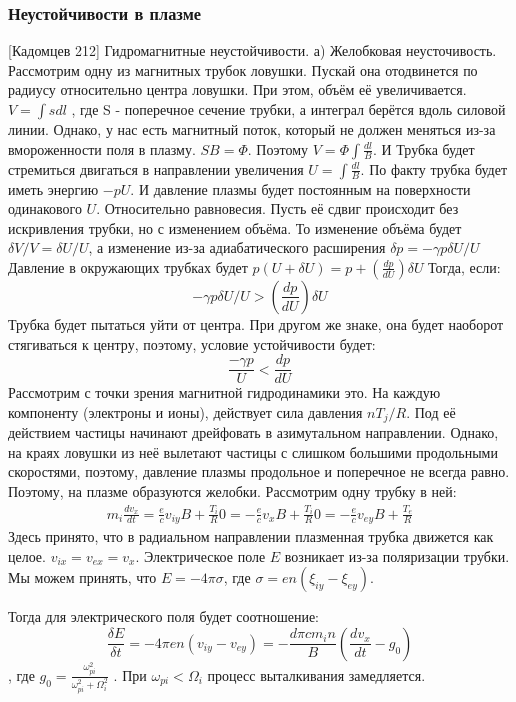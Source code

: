 \documentclass[10pt, a4paper]{article}
\begin{document}
\subsubsection{Неустойчивости в плазме}
[Кадомцев 212]
Гидромагнитные неустойчивости.
а) Желобковая неусточивость.
Рассмотрим одну из магнитных трубок ловушки. Пускай она отодвинется по радиусу относительно центра ловушки. При этом, объём её увеличивается. $V=\int s dl$ , где S - поперечное сечение трубки, а интеграл берётся вдоль силовой линии. Однако, у нас есть магнитный поток, который не должен меняться из-за вмороженности поля в плазму. $SB=\Phi$. Поэтому $V=\Phi \int \frac{dl}{B}$. И Трубка будет стремиться двигаться в направлении увеличения $U=\int \frac{dl}{B}$. По факту трубка будет иметь энергию $-pU$. И давление плазмы будет постоянным на поверхности одинакового $U$.
Относительно равновесия. Пусть её сдвиг происходит без искривления трубки, но с изменением объёма. То изменение объёма будет $\delta V/V= \delta U/U$, а изменение из-за адиабатического расширения $\delta p = -\gamma p \delta U/U$ 
Давление в окружающих трубках будет $p(U+\delta U)=p+(\frac{dp}{dU}) \delta U$
Тогда, если:
\begin{equation}
	-\gamma p \delta U/U > (\frac{dp}{dU}) \delta U
\end{equation}
Трубка будет пытаться уйти от центра. При другом же знаке, она будет наоборот стягиваться к центру, поэтому, условие устойчивости будет:
\begin{equation}
	\frac{ -\gamma p}{U} < \frac{dp}{dU}
\end{equation}
Рассмотрим с точки зрения магнитной гидродинамики это. На каждую компоненту (электроны и ионы), действует сила давления $nT_j /R$. Под её действием частицы начинают дрейфовать в азимутальном направлении.
Однако, на краях ловушки из неё вылетают частицы с слишком большими продольными скоростями, поэтому, давление плазмы продольное и поперечное не всегда равно. Поэтому, на плазме образуются желобки. Рассмотрим одну трубку в ней:
\begin{align*}
	m_i \frac{d v_x}{dt}= \frac{e}{c} v_{iy} B + \frac{T_i}{R}
	0= -\frac{e}{c} v_{x} B + \frac{T_i}{R}
	0= -\frac{e}{c} v_{ey} B + \frac{T_e}{R}
\end{align*}
Здесь принято, что в радиальном направлении плазменная трубка движется как целое. $v_{ix}=v_{ex}=v_x$. Электрическое поле $E$ возникает из-за поляризации трубки. Мы можем принять, что $E=- 4 \pi \sigma$, где $\sigma=en(\xi_{iy} - \xi_{ey})$. 

Тогда для электрического поля будет соотношение:
\begin{equation}
	\frac{\delta E}{\delta t} = -4 \pi e n (v_{iy}-v_{ey})=- \frac{d \pi c m_i n}{B} (\frac{d v_x}{dt} - g_0)
\end{equation}
, где $g_0=\frac{\omega^2_{pi}}{\omega^2_{pi}+\Omega^2_i}$ . При $\omega_{pi} <\Omega_{i}$ процесс выталкивания замедляется.
\end{document}
